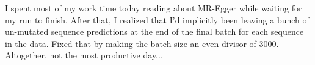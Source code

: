 \begin{Minutes}{}
\maketitle
{}
I spent most of my work time today reading about MR-Egger while waiting for my run to finish. After that, I realized that I'd implicitly been leaving a bunch of un-mutated sequence predictions at the end of the final batch for each sequence in the data. Fixed that by making the batch size an even divisor of 3000. Altogether, not the most productive day...
\end{Minutes}
